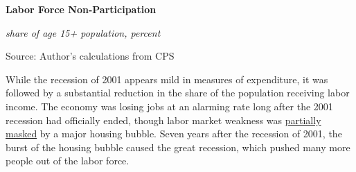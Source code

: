 \documentclass{report}
\newcommand{\barylab}[2]{yticklabel style={text width=#1, align=right, 
		style={black!70}, text height=#2},}
\newcommand{\bbar}[2]{extra #1 ticks = {{#2}}, extra #1 tick labels = ,
		extra #1 tick style = {grid=major, grid style={thick, black!25}},}
\newcommand{\barplotnogrid}{xbar=0pt, axis line style={draw=none},
	    yticklabel style={align=left, anchor=east},
      		xmajorticks=false, ymajorgrids=false,   
	    ytick=data, tickwidth=0pt, area legend, reverse legend,
	    nodes near coords, nodes near coords align={horizontal},}
\begin{document}
{{{{{{{{{\begin{minipage}{0.38\textwidth}
\normalsize \textbf{Labor Force Non-Participation}

\footnotesize{\textit{share of age 15+ population, percent}}

\hspace*{-4mm} 

\footnotesize{Source: Author's calculations from CPS}
\end{minipage} \hspace{4mm}
\begin{minipage}{0.34\textwidth}
\small 
\end{minipage}
\vspace{1mm}

\begin{minipage}{0.76\textwidth}
\small While the recession of 2001 appears mild in measures of expenditure, it was followed by a substantial reduction in the share of the population receiving labor income. The economy was losing jobs at an alarming rate long after the 2001 recession had officially ended, though labor market weakness was \href{https://www.aeaweb.org/articles?id=10.1257/jep.30.2.179}{partially masked} by a major housing bubble. Seven years after the recession of 2001, the burst of the housing bubble caused the great recession, which pushed many more people out of the labor force.
\end{minipage}

\vspace{1.5mm}

}}}}}}}}}
\end{document}
